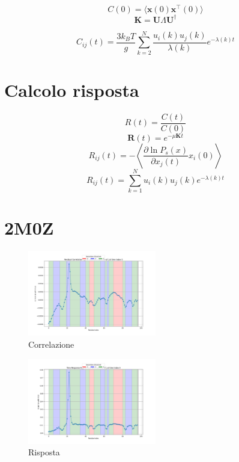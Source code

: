 \documentclass{article}
\begin{document}
\begin{equation}
    C(0) = \langle \mathbf{x}(0) \mathbf{x}^\top(0) \rangle
    \end{equation}
\begin{equation}
    \mathbf{K} = \mathbf{U} \Lambda \mathbf{U}^\dagger
    \end{equation}
        
\begin{equation}
    C_{ij}(t) = \frac{3 k_B T}{g} \sum_{k=2}^{N} \frac{u_i(k) u_j(k)}{\lambda(k)} e^{-\lambda(k) t}
    \end{equation}
        
\section{Calcolo risposta}
\begin{equation}
    R(t) = \frac{C(t)}{C(0)}
    \end{equation}
\begin{equation}
    \mathbf{R}(t) = e^{-\mu \mathbf{K} t}
    \end{equation}
\begin{equation}
    R_{ij}(t) = - \left\langle \frac{\partial \ln P_s(x)}{\partial x_j(t)} x_i(0) \right\rangle
    \end{equation}
\begin{equation}
    R_{ij}(t) = \sum_{k=1}^{N} u_i(k) u_j(k) e^{-\lambda(k) t}
    \end{equation}





\section{2M0Z}
\begin{figure}[H]
    \centering
    \includegraphics[width=0.5\textwidth]{images/2m0zResidual Correlation C_ij for i=22 as a function of j at time index 0.png}
    \caption{Correlazione}
\end{figure}
\begin{figure}[H]
    \centering
    \includegraphics[width=0.5\textwidth]{"images/2m0zTime Response R_ij for i=22 as a function of j at time index 0.png"}
    \caption{Risposta}
\end{figure}
\end{document}
